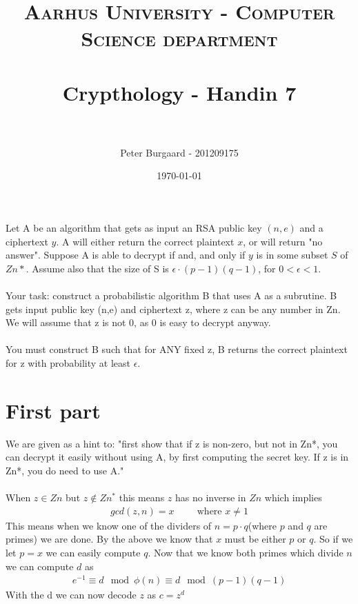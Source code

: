 \documentclass[paper=a4, fontsize=11pt]{scrartcl} %
\title{	
	\normalfont \normalsize 
	\textsc{Aarhus University - Computer Science department} \\ [25pt] %
	\horrule{0.5pt} \\[0.4cm] %
	\huge Crypthology - Handin 7 \\ %
	\horrule{2pt} \\[0.5cm] %
}
\author{Peter Burgaard - 201209175} %
\date{\normalsize\today} %
\numberwithin{equation}{section} %
\numberwithin{figure}{section} %
\numberwithin{table}{section} %
\begin{document}
	
	\maketitle %

Let A be an algorithm that gets as input an RSA public key $(n,e)$ and a ciphertext $y$. A will either return the correct plaintext $x$, or will return "no answer". Suppose A is able to decrypt if and, and only if $y$ is in some subset $S$ of $Zn*$. Assume also that the size of S is $\epsilon \cdot (p-1)(q-1)$, for  $0< \epsilon < 1$.
\\ \\
Your task: construct a probabilistic algorithm B that uses A as a subrutine. B gets input public key (n,e) and ciphertext z, where z can be any number in Zn. We will assume that z is not 0, as 0 is easy to decrypt anyway. \\ \\
You must construct B such that for ANY fixed z, B returns the correct plaintext for z with probability at least $\epsilon$.
\section*{First part}
We are given as a hint to: "first show that if z is non-zero, but not in Zn*, you can decrypt it easily without using A, by first computing the secret key. If z is in Zn*, you do need to use A."
\\ \\
When $z\in Zn$ but $z\not\in Zn^*$ this means $z$ has no inverse in $Zn$ which implies 
\begin{align*}
gcd(z,n)=x \hspace{1cm} \text{where } x\neq 1
\end{align*}
This means when we know one of the dividers of $n=p\cdot q$(where $p$ and $q$ are primes) we are done. By the above we know that $x$ must be either $p$ or $q$. So if we let $p=x$ we can easily compute $q$. Now that we know both primes which divide $n$ we can compute $d$ as
\begin{align*}
e^{-1}\equiv d \mod{\phi(n)}\equiv d \mod{(p-1)(q-1)}
\end{align*}
With the d we can now decode $z$ as $c=z^d$
\end{document}
